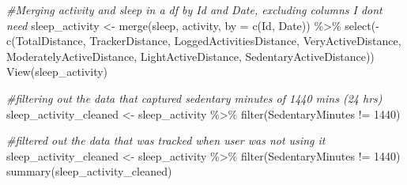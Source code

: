 \documentclass[
]{article}
\newenvironment{Shaded}{\begin{snugshade}}{\end{snugshade}}
\newcommand{\AttributeTok}[1]{\textcolor[rgb]{0.77,0.63,0.00}{#1}}
\newcommand{\CommentTok}[1]{\textcolor[rgb]{0.56,0.35,0.01}{\textit{#1}}}
\newcommand{\DecValTok}[1]{\textcolor[rgb]{0.00,0.00,0.81}{#1}}
\newcommand{\FunctionTok}[1]{\textcolor[rgb]{0.00,0.00,0.00}{#1}}
\newcommand{\NormalTok}[1]{#1}
\newcommand{\OtherTok}[1]{\textcolor[rgb]{0.56,0.35,0.01}{#1}}
\newcommand{\SpecialCharTok}[1]{\textcolor[rgb]{0.00,0.00,0.00}{#1}}
\newcommand{\StringTok}[1]{\textcolor[rgb]{0.31,0.60,0.02}{#1}}
\begin{document}
\begin{Shaded}
\begin{Highlighting}[]
\CommentTok{\#Merging activity and sleep in a df by \textquotesingle{}Id\textquotesingle{} and \textquotesingle{}Date\textquotesingle{}, excluding columns I don\textquotesingle{}t need}
\NormalTok{sleep\_activity }\OtherTok{\textless{}{-}} \FunctionTok{merge}\NormalTok{(sleep, activity, }\AttributeTok{by =} \FunctionTok{c}\NormalTok{(}\StringTok{\textquotesingle{}Id\textquotesingle{}}\NormalTok{, }\StringTok{\textquotesingle{}Date\textquotesingle{}}\NormalTok{)) }\SpecialCharTok{\%\textgreater{}\%} 
  \FunctionTok{select}\NormalTok{(}\SpecialCharTok{{-}}\FunctionTok{c}\NormalTok{(TotalDistance, TrackerDistance, LoggedActivitiesDistance, }
\NormalTok{            VeryActiveDistance, ModeratelyActiveDistance, LightActiveDistance, SedentaryActiveDistance))}
\FunctionTok{View}\NormalTok{(sleep\_activity)}

\CommentTok{\#filtering out the data that captured sedentary minutes of 1440 mins (24 hrs)}
\NormalTok{sleep\_activity\_cleaned }\OtherTok{\textless{}{-}}\NormalTok{ sleep\_activity }\SpecialCharTok{\%\textgreater{}\%} 
  \FunctionTok{filter}\NormalTok{(SedentaryMinutes }\SpecialCharTok{!=} \DecValTok{1440}\NormalTok{)}

\CommentTok{\#filtered out the data that was tracked when user was not using it}
\NormalTok{sleep\_activity\_cleaned }\OtherTok{\textless{}{-}}\NormalTok{ sleep\_activity }\SpecialCharTok{\%\textgreater{}\%} 
  \FunctionTok{filter}\NormalTok{(SedentaryMinutes }\SpecialCharTok{!=} \DecValTok{1440}\NormalTok{)}
\FunctionTok{summary}\NormalTok{(sleep\_activity\_cleaned)}
\end{Highlighting}
\end{Shaded}
\end{document}
